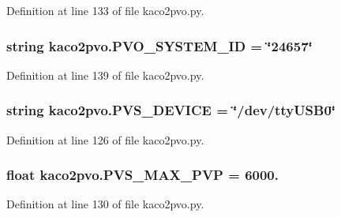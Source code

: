 Definition at line 133 of file kaco2pvo.\+py.

\hypertarget{namespacekaco2pvo_aa43938367200428da66c8ef5a5997de1}{}
\subsubsection[{P\+V\+O\+\_\+\+S\+Y\+S\+T\+E\+M\+\_\+\+I\+D}]{\setlength{\rightskip}{0pt plus 5cm}string kaco2pvo.\+P\+V\+O\+\_\+\+S\+Y\+S\+T\+E\+M\+\_\+\+I\+D = \char`\"{}24657\char`\"{}}\label{namespacekaco2pvo_aa43938367200428da66c8ef5a5997de1}


Definition at line 139 of file kaco2pvo.\+py.

\hypertarget{namespacekaco2pvo_ac673eb9e5b727f759eeea8edb990c81c}{}
\subsubsection[{P\+V\+S\+\_\+\+D\+E\+V\+I\+C\+E}]{\setlength{\rightskip}{0pt plus 5cm}string kaco2pvo.\+P\+V\+S\+\_\+\+D\+E\+V\+I\+C\+E = \char`\"{}/dev/tty\+U\+S\+B0\char`\"{}}\label{namespacekaco2pvo_ac673eb9e5b727f759eeea8edb990c81c}


Definition at line 126 of file kaco2pvo.\+py.

\hypertarget{namespacekaco2pvo_aecad1a1f015e701294ae4e083bfade40}{}
\subsubsection[{P\+V\+S\+\_\+\+M\+A\+X\+\_\+\+P\+V\+P}]{\setlength{\rightskip}{0pt plus 5cm}float kaco2pvo.\+P\+V\+S\+\_\+\+M\+A\+X\+\_\+\+P\+V\+P = 6000.}\label{namespacekaco2pvo_aecad1a1f015e701294ae4e083bfade40}


Definition at line 130 of file kaco2pvo.\+py.

\hypertarget{namespacekaco2pvo_a254420e2cbb7034d7e494c8176a724ad}{}
